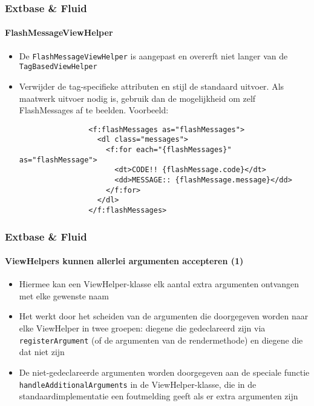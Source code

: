 \begin{frame}[fragile]
	\frametitle{Extbase \& Fluid}
	\framesubtitle{FlashMessageViewHelper}

	\lstset{basicstyle=\tiny\ttfamily}

	\begin{itemize}
		\item De \texttt{FlashMessageViewHelper} is aangepast en overerft niet langer van de \texttt{TagBasedViewHelper}

		\item Verwijder de tag-specifieke attributen en stijl de standaard uitvoer. Als maatwerk uitvoer nodig is, gebruik
			dan de mogelijkheid om zelf FlashMessages af te beelden. Voorbeeld:

			\begin{lstlisting}
				<f:flashMessages as="flashMessages">
				  <dl class="messages">
				    <f:for each="{flashMessages}" as="flashMessage">
				      <dt>CODE!! {flashMessage.code}</dt>
				      <dd>MESSAGE:: {flashMessage.message}</dd>
				    </f:for>
				  </dl>
				</f:flashMessages>
			\end{lstlisting}

	\end{itemize}

\end{frame}


\begin{frame}[fragile]
	\frametitle{Extbase \& Fluid}
	\framesubtitle{ViewHelpers kunnen allerlei argumenten accepteren (1)}

	\begin{itemize}

		\item Hiermee kan een ViewHelper-klasse elk aantal extra argumenten ontvangen
			met elke gewenste naam

		\item Het werkt door het scheiden van de argumenten die doorgegeven worden naar
			elke ViewHelper in twee groepen: diegene die gedeclareerd zijn via \texttt{registerArgument}
			(of de argumenten van de rendermethode) en diegene die dat niet zijn

		\item De niet-gedeclareerde argumenten worden doorgegeven aan de speciale functie
			\texttt{handleAdditionalArguments}
			in de ViewHelper-klasse, die in de standaardimplementatie een foutmelding geeft als
			er extra argumenten zijn

	\end{itemize}

\end{frame}

